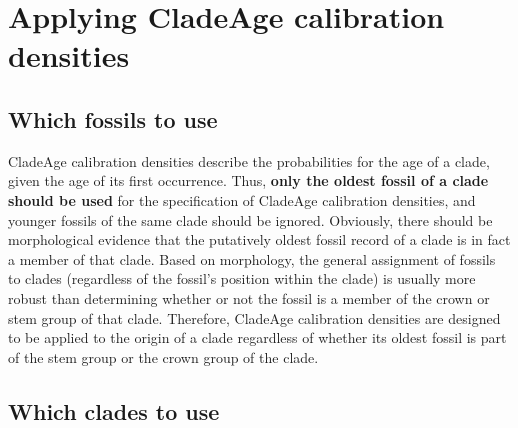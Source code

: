 \documentclass{article}
\begin{document}
\section{Applying CladeAge calibration densities}

\subsection{Which fossils to use}

CladeAge calibration densities describe the probabilities for the age of a clade, given the age of its first occurrence. Thus, \textbf{only the oldest fossil of a clade should be used} for the specification of CladeAge calibration densities, and younger fossils of the same clade should be ignored. Obviously, there should be morphological evidence that the putatively oldest fossil record of a clade is in fact a member of that clade. Based on morphology, the general assignment of fossils to clades (regardless of the fossil's position within the clade) is usually more robust than determining whether or not the fossil is a member of the crown or stem group of that clade. Therefore, CladeAge calibration densities are designed to be applied to the origin of a clade regardless of whether its oldest fossil is part of the stem group or the crown group of the clade.

\subsection{Which clades to use}
\end{document}
